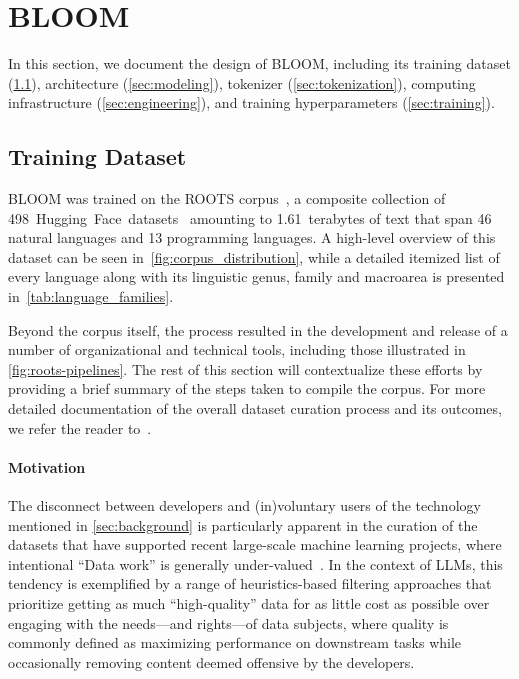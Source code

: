 \section{BLOOM}

In this section, we document the design of BLOOM, including its training dataset (\ref{sec:dataset}), architecture (\ref{sec:modeling}), tokenizer (\ref{sec:tokenization}), computing infrastructure (\ref{sec:engineering}), and training hyperparameters (\ref{sec:training}).

\subsection{Training Dataset}
\label{sec:dataset}

BLOOM was trained on the ROOTS corpus~\citep{laurencon2022bigscience}, a composite collection of 498~Hugging~Face~datasets~\citep{lhoest-etal-2021-datasets} amounting to 1.61~terabytes of text that span 46 natural languages and 13 programming languages. A high-level overview of this dataset can be seen in~\ref{fig:corpus_distribution}, while a detailed itemized list of every language along with its linguistic genus, family and macroarea is presented in~\ref{tab:language_families}.

Beyond the corpus itself, the process resulted in the development and release of a number of organizational and technical tools, including those illustrated in \ref{fig:roots-pipelines}.
The rest of this section will contextualize these efforts by providing a brief summary of the steps taken to compile the corpus. For more detailed documentation of the overall dataset curation process and its outcomes, we refer the reader to~\citet{laurencon2022bigscience}.

\paragraph{Motivation} The disconnect between developers and (in)voluntary users of the technology mentioned in \ref{sec:background} is particularly apparent in the curation of the datasets that have supported recent large-scale machine learning projects, where intentional ``Data work'' is generally under-valued~\citep{sambasivan2021cascades}. In the context of LLMs, this tendency is exemplified by a range of heuristics-based filtering approaches that prioritize getting as much ``high-quality'' data for as little cost as possible over engaging with the needs---and rights---of data subjects, where quality is commonly defined as maximizing performance on downstream tasks while occasionally removing content deemed offensive by the developers.


